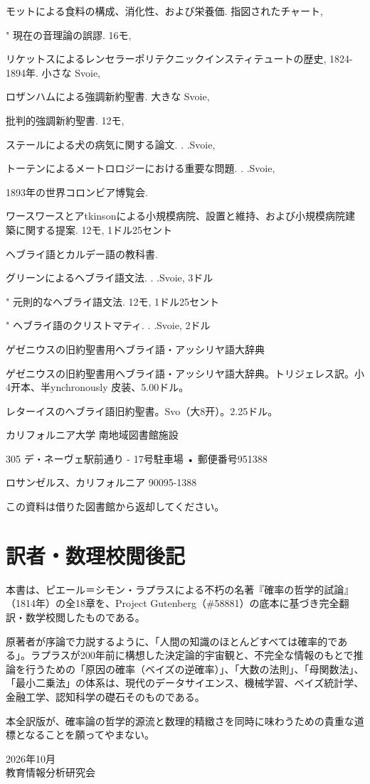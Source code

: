 \documentclass[a4paper,11pt,openany]{ltjsbook}
\begin{document}
モットによる食料の構成、消化性、および栄養価. 指図されたチャート,

"      現在の音理論の誤謬. 16モ,

リケットスによるレンセラーポリテクニックインスティテュートの歴史, 1824-1894年. 小さな Svoie,

ロザンハムによる強調新約聖書. 大きな Svoie,

批判的強調新約聖書. 12モ,

ステールによる犬の病気に関する論文. . .Svoie,

トーテンによるメートロロジーにおける重要な問題. . .Svoie,

1893年の世界コロンビア博覧会.

ワースワースとアtkinsonによる小規模病院、設置と維持、および小規模病院建築に関する提案. 12モ, 1ドル25セント

ヘブライ語とカルデー語の教科書.

グリーンによるヘブライ語文法. . .Svoie, 3ドル

"       元則的なヘブライ語文法. 12モ, 1ドル25セント

"       ヘブライ語のクリストマティ. . .Svoie, 2ドル

ゲゼニウスの旧約聖書用ヘブライ語・アッシリヤ語大辞典

ゲゼニウスの旧約聖書用ヘブライ語・アッシリヤ語大辞典。トリジェレス訳。小4开本、半ynchronously 皮装、5.00ドル。

レターイスのヘブライ語旧約聖書。Svo（大8开）。2.25ドル。

カリフォルニア大学
南地域図書館施設

305 デ・ネーヴェ駅前通り - 17号駐車場 • 郵便番号951388

ロサンゼルス、カリフォルニア 90095-1388

この資料は借りた図書館から返却してください。


\backmatter

\chapter{訳者・数理校閲後記}

本書は、ピエール＝シモン・ラプラスによる不朽の名著『確率の哲学的試論』（1814年）の全18章を、Project Gutenberg（\#58881）の底本に基づき完全翻訳・数学校閲したものである。

原著者が序論で力説するように、「人間の知識のほとんどすべては確率的である」。ラプラスが200年前に構想した決定論的宇宙観と、不完全な情報のもとで推論を行うための「原因の確率（ベイズの逆確率）」、「大数の法則」、「母関数法」、「最小二乗法」の体系は、現代のデータサイエンス、機械学習、ベイズ統計学、金融工学、認知科学の礎石そのものである。

本全訳版が、確率論の哲学的源流と数理的精緻さを同時に味わうための貴重な道標となることを願ってやまない。

\begin{flushright}
2026年10月\\
教育情報分析研究会
\end{flushright}
\end{document}
